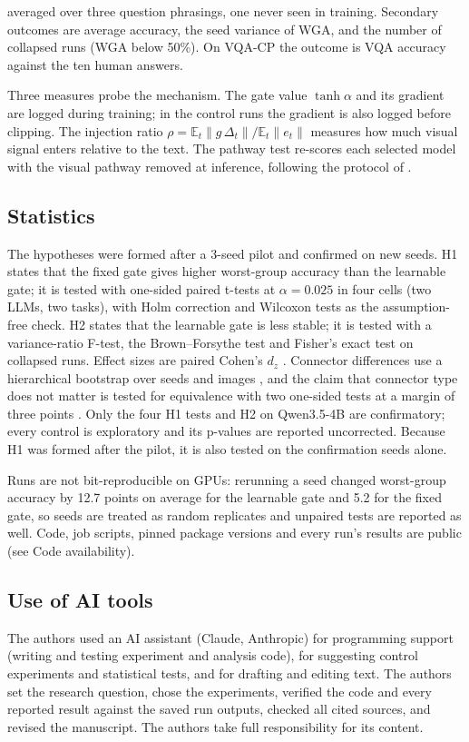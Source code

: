 averaged over three question phrasings, one never seen in training. Secondary outcomes are average accuracy, the
seed variance of WGA, and the number of collapsed runs (WGA below 50\%). On VQA-CP the outcome is VQA accuracy
against the ten human answers.

Three measures probe the mechanism. The gate value \(\tanh\alpha\) and its gradient are logged during training; in the
control runs the gradient is also logged before clipping. The injection ratio \(\rho = \mathbb{E}_t\|g\,\Delta_t\| / \mathbb{E}_t\|e_t\|\) measures how much visual signal
enters relative to the text. The pathway test re-scores each selected model with the visual pathway removed at
inference, following the protocol of \citep{farazi2026gate}.

\subsection{Statistics}

The hypotheses were formed after a 3-seed pilot and confirmed on new seeds. H1 states that the fixed gate gives
higher worst-group accuracy than the learnable gate; it is tested with one-sided paired t-tests at
\(\alpha = 0.025\) in four cells (two LLMs, two tasks), with Holm correction \citep{holm1979simple} and Wilcoxon tests as the
assumption-free check. H2 states that the learnable gate is less stable; it is tested with a variance-ratio F-test,
the Brown--Forsythe test and Fisher's exact test on collapsed runs. Effect sizes are paired Cohen's \(d_z\)
\citep{cohen1988power}. Connector differences use a hierarchical bootstrap over seeds and images \citep{efron1993bootstrap}, and
the claim that connector type does not matter is tested for equivalence with two one-sided tests at a margin of
three points \citep{schuirmann1987tost}. Only the four H1 tests and H2 on Qwen3.5-4B are confirmatory; every control is
exploratory and its p-values are reported uncorrected. Because H1 was formed after the pilot, it is also tested on
the confirmation seeds alone.

Runs are not bit-reproducible on GPUs: rerunning a seed changed worst-group accuracy by 12.7 points on average for the
learnable gate and 5.2 for the fixed gate, so seeds are treated as random replicates and unpaired tests are reported
as well. Code, job scripts, pinned package versions and every run's results are public (see Code availability).

\subsection{Use of AI tools}

The authors used an AI assistant (Claude, Anthropic) for programming support (writing and testing experiment and
analysis code), for suggesting control experiments and statistical tests, and for drafting and editing text. The
authors set the research question, chose the experiments, verified the code and every reported result against the
saved run outputs, checked all cited sources, and revised the manuscript. The authors take full responsibility for its
content.
